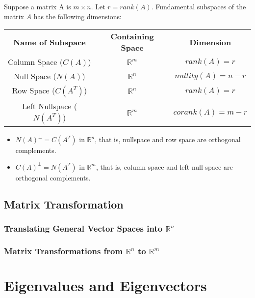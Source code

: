 \documentclass{report}
\begin{document}
		\begin{thm}
			Suppose a matrix A is $m \times n$. Let $r=rank(A)$. Fundamental subspaces of the matrix $A$ has the following dimensions:

			\begin{tabular}{ccc}
				\textbf{Name of Subspace} & \textbf{Containing Space} & \textbf{Dimension} \\
				Column Space ($C(A)$)             & $\mathbb{R}^m$            & $rank(A)=r$        \\
				Null Space ($N(A)$)               & $\mathbb{R}^n$            & $nullity(A)=n-r$   \\
				Row Space ($C(A^T)$)              & $\mathbb{R}^n$            & $rank(A)=r$        \\
				Left Nullspace ($N(A^T)$)         & $\mathbb{R}^m$            & $corank(A)=m-r$   
			\end{tabular}
		\end{thm}
		
		\begin{thm}
			\begin{itemize}
				\item $N(A)^\perp=C(A^T)$ in $\mathbb{R}^n$, that is, nullspace and row space are orthogonal complements.
				\item $C(A)^\perp=N(A^T)$ in $\mathbb{R}^m$, that is, column space and left null space are orthogonal complements.
			\end{itemize}
		\end{thm}
		
		\subsection{Matrix Transformation}
			\subsubsection{Translating General Vector Spaces into $\mathbb{R}^n$}
			
			\subsubsection{Matrix Transformations from $\mathbb{R}^n$ to $\mathbb{R}^m$}
		
	\section{Eigenvalues and Eigenvectors}
\end{document}

